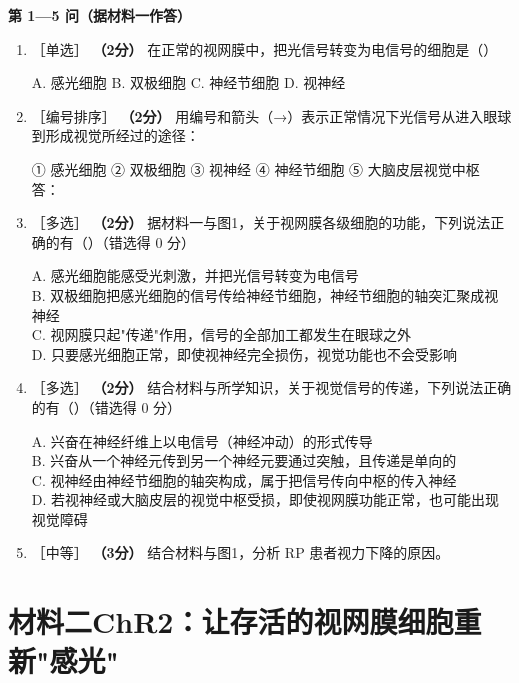 \documentclass[UTF8,a4paper,11pt]{ctexart}
\newcommand{\pt}[1]{\textbf{（#1分）}}
\newcommand{\lv}[1]{{\small\color{deepgreen}［#1］}}
\newcommand{\tian}[1]{\underline{\hspace{#1}}}
\newcommand{\choice}[1]{\par\smallskip\noindent #1\par}
\begin{document}
\begin{qbox}
\noindent\textbf{\color{deepgreen}第 1—5 问（据材料一作答）}
\begin{enumerate}[leftmargin=2.2em,itemsep=5pt]
\item \lv{单选} \pt{2} 在正常的视网膜中，把光信号转变为电信号的细胞是（\quad）
\choice{A. 感光细胞 \quad B. 双极细胞 \quad C. 神经节细胞 \quad D. 视神经}

\item \lv{编号排序} \pt{2} 用编号和箭头（→）表示正常情况下光信号从进入眼球到形成视觉所经过的途径：
\choice{① 感光细胞 \quad ② 双极细胞 \quad ③ 视神经 \quad ④ 神经节细胞 \quad ⑤ 大脑皮层视觉中枢\\
答：\tian{7.4cm}}

\item \lv{多选} \pt{2} 据材料一与图1，关于视网膜各级细胞的功能，下列说法正确的有（\quad）（错选得 0 分）
\choice{A. 感光细胞能感受光刺激，并把光信号转变为电信号\\
B. 双极细胞把感光细胞的信号传给神经节细胞，神经节细胞的轴突汇聚成视神经\\
C. 视网膜只起"传递"作用，信号的全部加工都发生在眼球之外\\
D. 只要感光细胞正常，即使视神经完全损伤，视觉功能也不会受影响}

\item \lv{多选} \pt{2} 结合材料与所学知识，关于视觉信号的传递，下列说法正确的有（\quad）（错选得 0 分）
\choice{A. 兴奋在神经纤维上以电信号（神经冲动）的形式传导\\
B. 兴奋从一个神经元传到另一个神经元要通过突触，且传递是单向的\\
C. 视神经由神经节细胞的轴突构成，属于把信号传向中枢的传入神经\\
D. 若视神经或大脑皮层的视觉中枢受损，即使视网膜功能正常，也可能出现视觉障碍}

\item \lv{中等} \pt{3} 结合材料与图1，分析 RP 患者视力下降的原因。\tian{0.48\textwidth}
\end{enumerate}
\end{qbox}

\section{材料二\quad ChR2：让存活的视网膜细胞重新"感光"}
\end{document}
